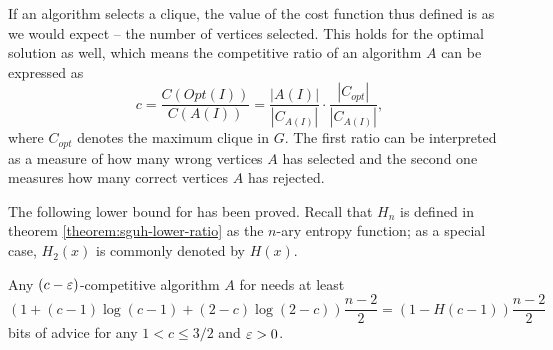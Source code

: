If an algorithm selects a clique, the value of the cost function thus
defined is as we would expect -- the number of vertices selected. This
holds for the optimal solution as well, which means the competitive ratio
of an algorithm $A$ can be expressed as
$$
    c = \frac{C(Opt(I))}{C(A(I))} = \frac{|A(I)|}{|C_{A(I)}|} \cdot
    \frac{|C_{opt}|}{|C_{A(I)}|},
$$
where $C_{opt}$ denotes the maximum clique in $G$. The first ratio can be
interpreted as a measure of how many wrong vertices $A$ has selected and
the second one measures how many correct vertices $A$ has rejected.

The following lower bound for  has been proved.
Recall that $H_n$ is defined in theorem \ref{theorem:sguh-lower-ratio} as
the $n$-ary entropy function; as a special case, $H_2(x)$ is commonly
denoted by $H(x)$.

\begin{theorem}\label{theorem:maximum-clique}
    Any $(c - \varepsilon)$-competitive algorithm $A$ for 
    needs at least
    $$
        (1 + (c - 1) \log (c - 1) + (2 - c) \log (2 - c)) \frac{n-2}{2} =
        (1 - H(c - 1))\frac{n-2}{2}
    $$
    bits of advice for any $1 < c \leq 3/2$ and $\varepsilon > 0$.
\end{theorem}


